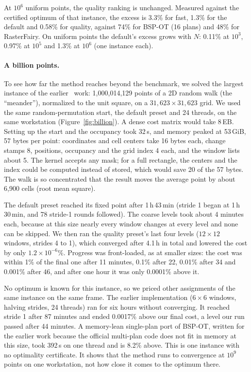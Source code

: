 At $10^6$ uniform points, the quality ranking is unchanged. Measured against the certified
optimum of that instance, the excess is 3.3\% for fast, 1.3\% for the default and 0.58\% for
quality, against 74\% for BSP-OT (16 plans) and 48\% for RasterFairy. On uniform points the
default's excess grows with $N$: 0.11\% at $10^3$, 0.97\% at $10^5$ and 1.3\% at $10^6$ (one
instance each).

\paragraph{A billion points.} To see how far the method reaches beyond the benchmark, we solved
the largest instance of the earlier \ShuffleSnap\ work: 1{,}000{,}014{,}129 points of a 2D
random walk (the ``meander''), normalized to the unit square, on a $31{,}623\times31{,}623$
grid. We used the same random-permutation start, the default preset and 24 threads, on
the same workstation (Figure~\ref{fig:billion}). A dense cost matrix
would take 8\,EB. Setting up the start and the occupancy took 32\,s, and memory peaked at
53\,GiB, 57 bytes per point: coordinates and cell centers take 16 bytes each, change stamps
8, positions, occupancy and the grid index 4 each, and the window lists about 5. The kernel
accepts any mask; for a full rectangle, the centers and the index could be computed instead
of stored, which would save 20 of the 57 bytes. The walk is so concentrated that the result
moves the average point by about 6{,}900 cells (root mean square).

The default preset reached its fixed point after 1\,h\,43\,min (stride 1 began at
1\,h\,30\,min, and 78 stride-1 rounds followed). The coarse levels took about 4 minutes each,
because at this size nearly every window changes at every level and none can be skipped.
We then ran the quality preset's last four levels ($12\times12$ windows, strides 4 to 1),
which converged after 4.1\,h in total and lowered the cost by only $1.2\times10^{-6}$\%. Progress was front-loaded, as at smaller sizes: the cost
was within 1\% of the final one after 11 minutes, 0.1\% after 22, 0.01\% after 34 and 0.001\%
after 46, and after one hour it was only 0.0001\% above it.

No optimum is known for this instance, so we priced other assignments of the same instance on
the same frame. The earlier implementation ($6\times6$ windows, halving strides, 24 threads)
ran for six hours without converging. It reached stride 1 after 87 minutes and ended 0.0017\%
above our final cost, a level our run passed after 44 minutes. A memory-lean single-plan
port of BSP-OT, written for the earlier work because the official multi-plan code does not fit
in memory at this size, took 392\,s on one thread and is 8.2\% above. This is one instance
with no optimality certificate. It shows that the method runs to convergence at $10^9$ points
on one workstation, not how close it comes to the optimum there.

